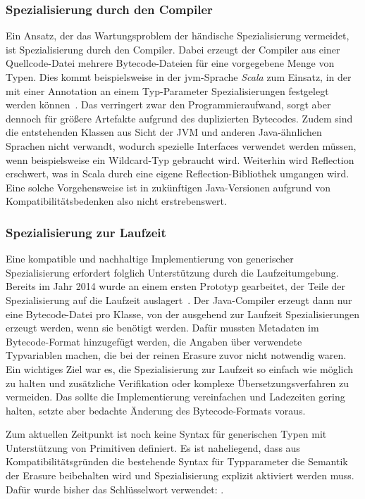 \subsubsection{Spezialisierung durch den Compiler}

Ein Ansatz, der das Wartungsproblem der händische Spezialisierung vermeidet, ist Spezialisierung durch den Compiler.
Dabei erzeugt der Compiler aus einer Quellcode-Datei mehrere Bytecode-Dateien für eine vorgegebene Menge von Typen.
Dies kommt beispielsweise in der \ac{jvm}-Sprache \emph{Scala} zum Einsatz, in der mit einer Annotation an einem Typ-Parameter Spezialisierungen festgelegt werden können~\cite{scala-specialized}.
Das verringert zwar den Programmieraufwand, sorgt aber dennoch für größere Artefakte aufgrund des duplizierten Bytecodes.
Zudem sind die entstehenden Klassen aus Sicht der JVM und anderen Java-ähnlichen Sprachen nicht verwandt, wodurch spezielle Interfaces verwendet werden müssen, wenn beispielsweise ein Wildcard-Typ gebraucht wird.
Weiterhin wird Reflection erschwert, was in Scala durch eine eigene Reflection-Bibliothek umgangen wird.
Eine solche Vorgehensweise ist in zukünftigen Java-Versionen aufgrund von Kompatibilitätsbedenken also nicht erstrebenswert.

\subsubsection{Spezialisierung zur Laufzeit}

Eine kompatible und nachhaltige Implementierung von generischer Spezialisierung erfordert folglich Unterstützung durch die Laufzeitumgebung.
Bereits im Jahr 2014 wurde an einem ersten Prototyp gearbeitet, der Teile der Spezialisierung auf die Laufzeit auslagert~\cite{specialization}.
Der Java-Compiler erzeugt dann nur eine Bytecode-Datei pro Klasse, von der ausgehend zur Laufzeit Spezialisierungen erzeugt werden, wenn sie benötigt werden.
Dafür mussten Metadaten im Bytecode-Format hinzugefügt werden, die Angaben über verwendete Typvariablen machen, die bei der reinen Erasure zuvor nicht notwendig waren.
Ein wichtiges Ziel war es, die Spezialisierung zur Laufzeit so einfach wie möglich zu halten und zusätzliche Verifikation oder komplexe Übersetzungsverfahren zu vermeiden.
Das sollte die Implementierung vereinfachen und Ladezeiten gering halten, setzte aber bedachte Änderung des Bytecode-Formats voraus.

Zum aktuellen Zeitpunkt ist noch keine Syntax für generischen Typen mit Unterstützung von Primitiven definiert.
Es ist naheliegend, dass aus Kompatibilitätsgründen die bestehende Syntax für Typparameter die Semantik der Erasure beibehalten wird und Spezialisierung explizit aktiviert werden muss.
Dafür wurde bisher das Schlüsselwort  verwendet: .

